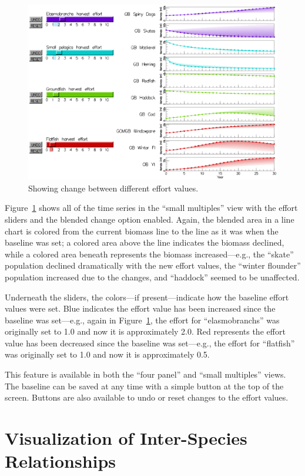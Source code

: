 \begin{figure}[h]
	\centering
	\includegraphics[width=12cm]{figures/eps/msprod_change.eps}
	\caption{Showing change between different effort values.}
	\label{fig:msprod_change}
\end{figure}

Figure~\ref{fig:msprod_change} shows all of the time series in the ``small multiples'' view with the effort sliders and the blended change option enabled.  Again, the blended area in a line chart is colored from the current biomass line to the line as it was when the baseline was set; a colored area above the line indicates the biomass declined, while a colored area beneath represents the biomass increased---e.g., the ``skate'' population declined dramatically with the new effort values, the ``winter flounder'' population increased due to the changes, and ``haddock'' seemed to be unaffected.

Underneath the sliders, the colors---if present---indicate how the baseline effort values were set.  Blue indicates the effort value has been increased since the baseline was set---e.g., again in Figure~\ref{fig:msprod_change}, the effort for ``elasmobranchs'' was originally set to 1.0 and now it is approximately 2.0.  Red represents the effort value has been decreased since the baseline was set---e.g., the effort for ``flatfish'' was originally set to 1.0 and now it is approximately 0.5.

This feature is available in both the ``four panel'' and ``small multiples'' views.  The baseline can be saved at any time with a simple button at the top of the screen.  Buttons are also available to undo or reset changes to the effort values.

\section{Visualization of Inter-Species Relationships}

